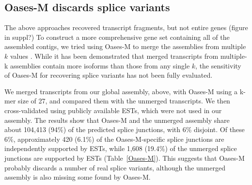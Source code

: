\documentclass[10pt]{article}
\begin{document}





\subsection*{Oases-M discards splice variants}

The above approaches recovered transcript fragments, but not entire genes
(figure in suppl?)
To construct a more comprehensive gene set containing all of the
assembled contigs, we tried using Oases-M to merge the assemblies from
multiple $k$ values \cite{Schulz:2012je}.  While it has been
demonstrated that merged transcripts from multiple-k assemblies
contain more isoforms than those from any single $k$, the sensitivity
of Oases-M for recovering splice variants has not been fully
evaluated.


We merged transcripts from our global assembly, above, with Oases-M using a
k-mer size of 27, and compared them with the unmerged transcripts.  We then
cross-validated using publicly available ESTs, which were not used in our
assembly.  The results show that Oases-M and the unmerged assembly share about
104,413 (94\%) of the predicted splice junctions, with 6\% disjoint.  Of these
6\%, approximately 420 (6.1\%) of the Oases-M-specific splice junctions are
independently supported by ESTs, while 1,608 (19.4\%) of the unmerged splice
junctions are supported by ESTs (Table~\ref{Oases-M}).  This suggests that Oases-M
probably discards a number of real splice variants, although the unmerged
assembly is also missing some found by Oases-M.
\end{document}
